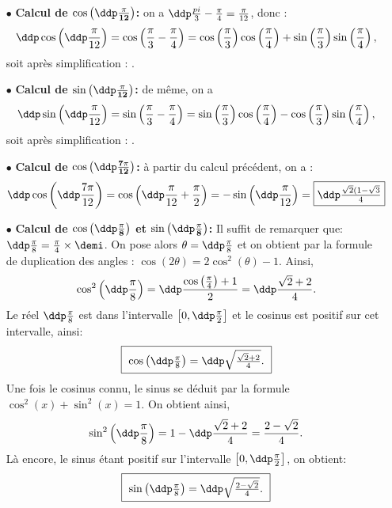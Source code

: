 
\begin{correction}  \;
\begin{itemize}
\item[$\bullet$] \textbf{Calcul de $\mathbf{\cos{\left(\ddp\frac{\pi}{12}\right)}}$:} on a $\ddp \frac{pi}{3}-\frac{\pi}{4} = \frac{\pi}{12}$, donc :
$$\ddp \cos\left(\ddp\frac{\pi}{12}\right) = \cos\left(\frac{\pi}{3}-\frac{\pi}{4}\right) = \cos \left(\frac{\pi}{3}\right)\cos \left(\frac{\pi}{4}\right) + \sin \left(\frac{\pi}{3}\right)\sin \left(\frac{\pi}{4}\right),$$
soit apr\`es simplification : .
\item[$\bullet$] \textbf{Calcul de $\mathbf{\sin{\left(\ddp\frac{\pi}{12}\right)}}$:}  de m\^eme, on a 
$$\ddp \sin\left(\ddp\frac{\pi}{12}\right) = \sin\left(\frac{\pi}{3}-\frac{\pi}{4}\right) = \sin \left(\frac{\pi}{3}\right)\cos \left(\frac{\pi}{4}\right) - \cos \left(\frac{\pi}{3}\right)\sin \left(\frac{\pi}{4}\right),$$
soit apr\`es simplification : .
\item[$\bullet$] \textbf{Calcul de $\mathbf{\cos{\left(\ddp\frac{7\pi}{12}\right)}}$:} \`a partir du calcul pr\'ec\'edent, on a :
$$\ddp \cos{\left(\ddp\frac{7\pi}{12}\right)} = \cos{\left(\ddp\frac{\pi}{12}+\frac{\pi}{2}\right)} = -\sin{\left(\ddp\frac{\pi}{12}\right)} = \fbox{$\ddp \frac{\sqrt{2}(1-\sqrt{3}}{4}$}$$
\item[$\bullet$] \textbf{Calcul de $\mathbf{\cos{\left(\ddp\frac{\pi}{8}\right)}}$ et $\mathbf{\sin{\left(\ddp\frac{\pi}{8}\right)}}$:}  Il suffit de remarquer que: $\ddp\frac{\pi}{8}=\frac{\pi}{4}\times \demi$. On pose alors $\theta=\ddp\frac{\pi}{8}$ et on obtient par la formule de duplication des angles : $\cos{(2\theta)}=2\cos^2{(\theta)}-1.$
Ainsi, 
$$\cos^2{\left(\ddp\frac{\pi}{8}\right)}=\ddp\frac{\cos{\left(\frac{\pi}{4}\right)}+1}{2}=\ddp\frac{\sqrt{2}+2}{4}.$$
Le r\'eel $\ddp\frac{\pi}{8}$ est dans l'intervalle $\left\lbrack 0,\ddp\frac{\pi}{2}\right\rbrack$ et le cosinus est positif sur cet intervalle, ainsi: 
\begin{equation*}
\fbox{
$\cos{\left(\ddp\frac{\pi}{8}\right)}=\ddp\sqrt{\frac{\sqrt{2}+2}{4}}.$
}
\end{equation*}
Une fois le cosinus connu, le sinus se d\'eduit par la formule $\cos^2{(x)}+\sin^2{(x)}=1$. On obtient ainsi, 
$$\sin^2{\left(\ddp\frac{\pi}{8}\right)}=1-\ddp \frac{\sqrt{2}+2}{4} = \frac{2-\sqrt{2}}{4}.$$
L\`a encore, le sinus \'etant positif sur l'intervalle $\left\lbrack 0,\ddp\frac{\pi}{2}\right\rbrack$, on obtient: 
\begin{equation*}
\fbox{
$\sin{\left(\ddp\frac{\pi}{8}\right)}=\ddp\sqrt{\frac{2-\sqrt{2}}{4}}.$
}
\end{equation*}
\end{itemize}
\end{correction}